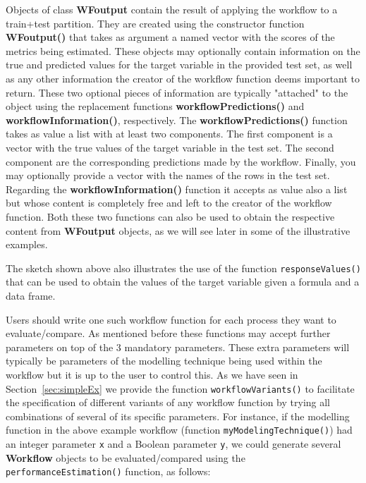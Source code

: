 \documentclass[10pt,a4paper]{article}\usepackage[]{graphicx}\usepackage[]{color}
\begin{document}
Objects of class \textbf{WFoutput} contain the result of applying the workflow to a train+test partition. They are created using the constructor function \textbf{WFoutput()} that takes as argument a named vector with the scores of the metrics being estimated. These objects may optionally contain information on the true and predicted values for the target variable in the provided test set, as well as any other information the creator of the workflow function deems important to return. These two optional pieces of information are typically "attached" to the object using the replacement functions \textbf{workflowPredictions()}  and \textbf{workflowInformation()}, respectively. The \textbf{workflowPredictions()} function takes as value a list with at least two components. The first component is a vector with the true values of the target variable in the test set. The second component are the corresponding predictions made by the workflow. Finally, you may optionally provide a vector with the names of the rows in the test set. Regarding the \textbf{workflowInformation()} function it accepts as value also a list but whose content is completely free and left to the creator of the workflow function. Both these two functions can also be used to obtain the respective content from \textbf{WFoutput} objects, as we will see later in some of the illustrative examples.

The sketch shown above also illustrates the use of the function
\texttt{responseValues()} that can be used to obtain the values of the target
variable given a formula and a data frame.

Users should write one such workflow function for each process they
want to evaluate/compare. As mentioned before these functions may
accept further parameters on top of the 3 mandatory parameters. These
extra parameters will typically be parameters of the modelling
technique being used within the workflow but it is up to the user to
control this. As we have seen in Section~\ref{sec:simpleEx} we provide
the function \texttt{workflowVariants()} to facilitate the specification of
different variants of any workflow function by trying all combinations
of several of its specific parameters. For instance, if the modelling
function in the above example workflow (function
\texttt{myModelingTechnique()}) had an integer parameter \texttt{x}
and a Boolean parameter \texttt{y}, we could generate several
\textbf{Workflow} objects to be evaluated/compared using the
\texttt{performanceEstimation()} function, as follows:
\end{document}
